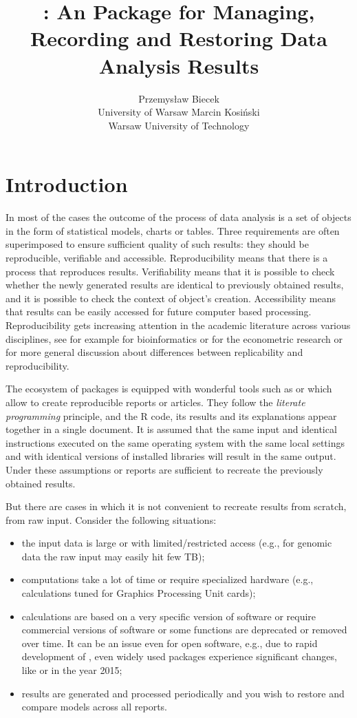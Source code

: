 \documentclass[nojss]{jss}\usepackage[]{graphicx}\usepackage[]{color}
\author{Przemys\l{}aw Biecek\\University of Warsaw \And 
        Marcin Kosi\'nski\\Warsaw University of Technology}
\title{\pkg{archivist}: An \proglang{R} Package for Managing, Recording and Restoring Data Analysis Results}
\begin{document}

\section{Introduction}

In most of the cases the outcome of the process of data analysis is a set of objects in the form of statistical models, charts or tables. Three requirements are often superimposed to ensure sufficient quality of such results: they should be reproducible, verifiable and accessible. Reproducibility means that there is a process that reproduces results. Verifiability means that it is possible to check whether the newly generated results are identical to previously obtained results{, and it is possible to check the context of object's creation}. Accessibility means that results can be easily accessed for future computer based processing. Reproducibility gets increasing attention in the academic literature across various disciplines, see for example \cite{Peng01072009} for bioinformatics or \cite{Koenker} for the econometric research or \cite{Replicability} for more general discussion about differences between replicability and reproducibility. 

The  ecosystem of packages is equipped with wonderful tools such as  \citep[see][]{knitr2, knitr} or  \citep[see][]{Sweave, Sweave2} which allow to create reproducible reports or articles. They follow the \textit{literate programming} principle, and the R code, its results and its explanations appear together in a single document. {It is assumed that} the same input and identical instructions executed on the same operating system with the same local settings and with identical versions of installed libraries will result in the same output. Under these assumptions  or  reports are sufficient to recreate the previously obtained results. 

But there are cases in which it is not convenient to recreate results from scratch, from raw input. Consider the following situations: 
\begin{itemize}
\item the input data is large or with limited/restricted access (e.g., for genomic data the raw input may easily hit few TB); 
\item computations take a lot of time or require specialized hardware (e.g., calculations tuned for Graphics Processing Unit cards); 
\item calculations are based on a very specific version of software or require commercial versions of software or some functions are  deprecated or removed over time. It can be an issue even for open software, e.g., due to rapid development of , even widely used packages experience significant changes, like  or  in the year 2015;
\item results are generated and processed periodically and you wish to restore and compare models across all reports. 
\end{itemize}
\end{document}
